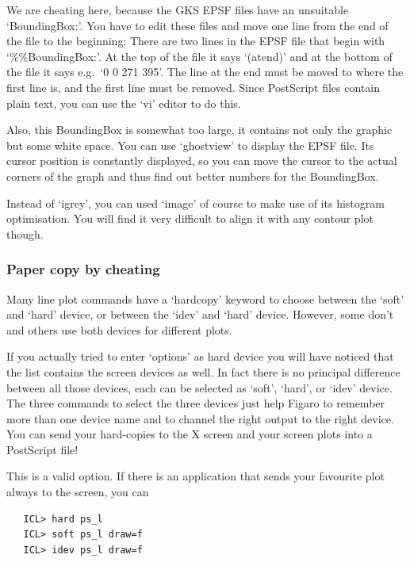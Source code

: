 \documentclass[11pt,twoside]{article}
\begin{document}
   We are cheating here, because the GKS EPSF files have an unsuitable
   `BoundingBox:'. You have to edit these files and move one line
   from the end of the file to the beginning: There are two lines in the
   EPSF file that begin with `\%\%BoundingBox:'. At the top of the file
   it says `(atend)' and at the bottom of the file it says e.g.\ `0 0 271
   395'. The line at the end must be moved to where the first line is,
   and the first line must be removed. Since PostScript files contain
   plain text, you can use the `vi' editor to do this.

   Also, this BoundingBox is somewhat too large, it contains not only
   the graphic but some white space. You can use `ghostview' to display
   the EPSF file. Its cursor position is constantly displayed, so you
   can move the cursor to the actual corners of the graph and thus find
   out better numbers for the BoundingBox.

   Instead of `igrey', you can used `image' of course to make use of its
   histogram optimisation. You will find it very difficult to align it
   with any contour plot though.


\subsubsection{Paper copy by cheating}

   Many line plot commands have a `hardcopy' keyword to choose between
   the `soft' and `hard' device, or between the `idev' and `hard'
   device. However, some don't and others use both devices for different
   plots.

   If you actually tried to enter `options' as hard device you will have
   noticed that the list contains the screen devices as well. In fact
   there is no principal difference between all those devices, each can
   be selected as `soft', `hard', or `idev' device. The three commands
   to select the three devices just help Figaro to remember more than
   one device name and to channel the right output to the right device.
   You can send your hard-copies to the X screen and your screen plots
   into a PostScript file!

   This is a valid option. If there is an application that sends your
   favourite plot always to the screen, you can

\begin{verbatim}
   ICL> hard ps_l
   ICL> soft ps_l draw=f
   ICL> idev ps_l draw=f
\end{verbatim}
\end{document}
